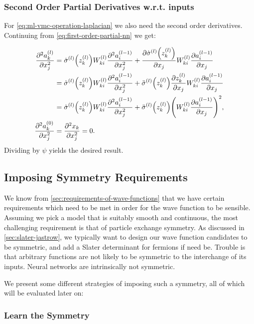 \documentclass[Thesis.tex]{subfiles}
\begin{document}
\subsubsection{Second Order Partial Derivatives w.r.t. inputs}

For \cref{eq:ml-vmc-operation-laplacian} we also need the second order
derivatives. Continuing from \cref{eq:first-order-partial-nn} we get:

\begin{align}
  \pdv[2]{a_k^{(l)}}{x_j} &= \dot\sigma^{(l)}\qty(z_k^{(l)})W_{ki}^{(l)}\pdv[2]{a_i^{(l-1)}}{x_j} + \pdv{\dot\sigma^{(l)}\qty(z_k^{(l)})}{x_j}W_{ki}^{(l)}\pdv{a_i^{(l-1)}}{x_j}\\
  &= \dot\sigma^{(l)}\qty(z_k^{(l)})W_{ki}^{(l)}\pdv[2]{a_i^{(l-1)}}{x_j} + \ddot\sigma^{(l)}\qty(z_k^{(l)})\pdv{z_k^{(l)}}{x_j}W_{ki}^{(l)}\pdv{a_i^{(l-1)}}{x_j}\\
                          &= \dot\sigma^{(l)}\qty(z_k^{(l)})W_{ki}^{(l)}\pdv[2]{a_i^{(l-1)}}{x_j} + \ddot\sigma^{(l)}\qty(z_k^{(l)})\qty(W_{ki}^{(l)}\pdv{a_i^{(l-1)}}{x_j})^2,\\
                            \pdv[2]{a_k^{(0)}}{x_j} &= \pdv[2]{x_k}{x_j} = 0.
\end{align}
Dividing by $\psi$ yields the desired result.


\subsection{Imposing Symmetry Requirements}

We know from \cref{sec:requirements-of-wave-functions} that we have certain
requirements which need to be met in order for the wave function to be sensible.
Assuming we pick a model that is suitably smooth and continuous, the most
challenging requirement is that of particle exchange symmetry. As discussed in
\cref{sec:slater-jastrow}, we typically want to design our wave function
candidates to be symmetric, and add a Slater determinant for fermions if need
be. Trouble is that arbitrary functions are not likely to be symmetric to the
interchange of its inputs. Neural networks are intrinsically not symmetric.

We present some different strategies of imposing such a symmetry, all of which
will be evaluated later on:

\subsubsection{Learn the Symmetry}
\end{document}
